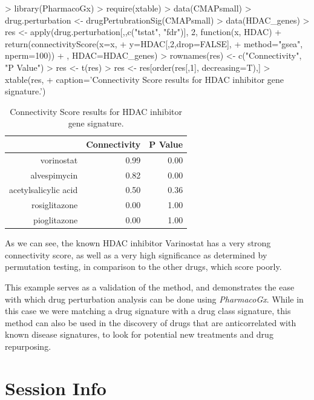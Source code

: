 \documentclass[11pt]{article}
\begin{document}
\begin{Schunk}
\begin{Sinput}
>   library(PharmacoGx)
>   require(xtable)
>   data(CMAPsmall)
>   drug.perturbation <- drugPertubrationSig(CMAPsmall)
>   data(HDAC_genes)
>   res <- apply(drug.perturbation[,,c("tstat", "fdr")], 2, function(x, HDAC){ 
+ 	    return(connectivityScore(x=x, 
+ 	                             y=HDAC[,2,drop=FALSE], 
+ 	                             method="gsea", nperm=100))
+ 	}, HDAC=HDAC_genes)
>   rownames(res) <- c("Connectivity", "P Value")
>   res <- t(res)
>   res <- res[order(res[,1], decreasing=T),]
>   xtable(res, 
+     caption='Connectivity Score results for HDAC inhibitor gene signature.')
\end{Sinput}
\begin{table}[ht]
\centering
\begin{tabular}{rrr}
  \hline
 & Connectivity & P Value \\ 
  \hline
vorinostat & 0.99 & 0.00 \\ 
  alvespimycin & 0.82 & 0.00 \\ 
  acetylsalicylic acid & 0.50 & 0.36 \\ 
  rosiglitazone & 0.00 & 1.00 \\ 
  pioglitazone & 0.00 & 1.00 \\ 
   \hline
\end{tabular}
\caption{Connectivity Score results for HDAC inhibitor gene signature.} 
\end{table}\end{Schunk}
As we can see, the known HDAC inhibitor Varinostat has a very strong connectivity score, as well as a very high significance as determined by permutation testing, in comparison to the other drugs, which score poorly. 

This example serves as a validation of the method, and demonstrates the ease with which drug perturbation analysis can be done using \textit{PharmacoGx}. While in this case we were matching a drug signature with a drug class signature, this method can also be used in the discovery of drugs that are anticorrelated with known disease signatures, to look for potential new treatments and drug repurposing. 
\section*{Session Info}
\end{document}
